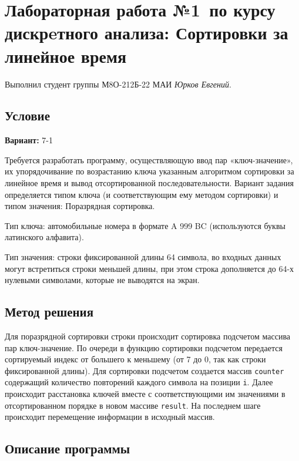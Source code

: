 \documentclass[12pt]{article}
\begin{document}
\section*{Лабораторная работа №1\, по курсу дискрeтного анализа: Сортировки за линейное время}

Выполнил студент группы М8О-212Б-22 МАИ \textit{Юрков Евгений}.

\subsection*{Условие}

\textbf{Вариант:} 7-1 

Требуется разработать программу, осуществляющую ввод пар «ключ-значение», их упорядочивание по возрастанию ключа
указанным алгоритмом сортировки за линейное время и вывод отсортированной последовательности.
Вариант задания определяется типом ключа (и соответствующим ему методом сортировки) и типом значения:
Поразрядная сортировка.

Тип ключа: автомобильные номера в формате A 999 BC (используются буквы латинского алфавита).

Тип значения: строки фиксированной длины 64 символа, во входных данных могут встретиться строки меньшей длины,
при этом строка дополняется до 64-х нулевыми символами, которые не выводятся на экран.

\newpage
\subsection*{Метод решения}

Для поразрядной сортировки строки происходит сортировка подсчетом массива пар ключ-значение. По очереди в функцию сортировки подсчетом передается
сортируемый индекс от большего к меньшему (от 7 до 0, так как строки фиксированной длины).
Для сортировки подсчетом создается массив \texttt{counter} содержащий количество повторений каждого символа на позиции \texttt{i}.
Далее происходит расстановка ключей вместе с соответствующими им значениями в отсортированном порядке в новом массиве \texttt{result}.
На последнем шаге происходит перемещение информации в исходный массив.

\newpage
\subsection*{Описание программы}
\end{document}
